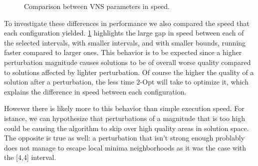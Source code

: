 \begin{figure}[htbp]
	\centering
	\caption{Comparison between VNS parameters in speed.} \label{fig:vnsIters}
\end{figure}

To investigate these differences in performance we also compared the speed that each configuration yielded.
\figurename{ \ref{fig:vnsIters}} highlights the large gap in speed between each of the selected intervals, with smaller intervals, and with smaller bounds, running faster compared to larger ones.
This behavior is to be expected since a higher perturbation magnitude causes solutions to be of overall worse quality compared to solutions affected by lighter perturbation.
Of course the higher the quality of a solution after a perturbation, the less time 2-Opt will take to optimize it, which explains the difference in speed between each configuration.

However there is likely more to this behavior than simple execution speed.
For istance, we can hypothesize that perturbations of a magnitude that is too high could be causing the algorithm to skip over high quality areas in solution space.
The opposite is true as well: a perturbation that isn't strong enough problably does not manage to escape local minima neighborhoods as it was the case with the [4,4] interval.

